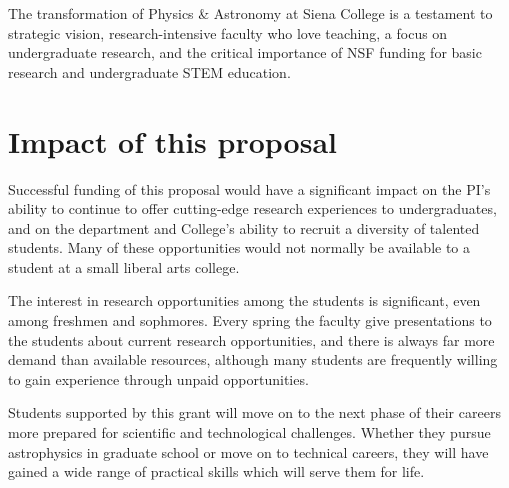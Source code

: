 \documentclass[12pt, preprint]{aastex}
\begin{document}

The transformation of Physics \& Astronomy at Siena College is a testament to
strategic vision, research-intensive faculty who love teaching, a focus on
undergraduate research, and the critical importance of NSF funding for basic
research and undergraduate STEM education.


\section{Impact of this proposal}

Successful funding of this proposal would have a significant impact on the PI's
ability to continue to offer cutting-edge research experiences to
undergraduates, and on the department and College's ability to recruit a
diversity of talented students.  Many of these opportunities would not normally
be available to a student at a small liberal arts college.

The interest in research opportunities among the students is significant, even
among freshmen and sophmores.  Every spring the faculty give presentations to
the students about current research opportunities, and there is always far more
demand than available resources, although many students are frequently willing
to gain experience through unpaid opportunities.

Students supported by this grant will move on to the next phase of their careers
more prepared for scientific and technological challenges.  Whether they pursue
astrophysics in graduate school or move on to technical careers, they will have
gained a wide range of practical skills which will serve them for life.
				
\end{document}
